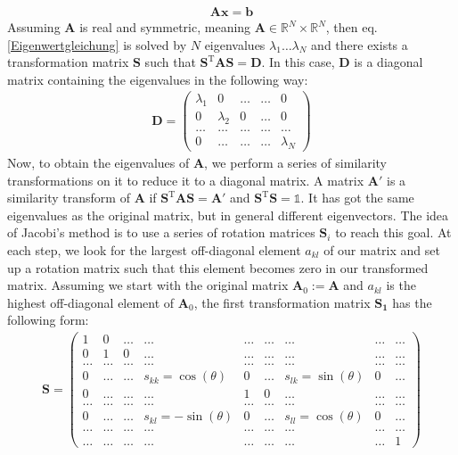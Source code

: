 \documentclass[10pt,a4paper]{article}
\begin{document}
\begin{align}\label{Eigenwertgleichung}
	\mathbf{A} \mathbf{x} = \mathbf{b}
\end{align}
Assuming $\mathbf{A}$ is real and symmetric, meaning $\mathbf{A}\in\mathbb{R}^N\times\mathbb{R}^N$, then eq. \eqref{Eigenwertgleichung} is solved by $N$ eigenvalues $\lambda_1\dots\lambda_N$ and there exists a transformation matrix $\mathbf{S}$ such that $\mathbf{S^{\mathrm{T}}}\mathbf{A}\mathbf{S}=\mathbf{D}$. In this case, $\mathbf{D}$ is a diagonal matrix containing the eigenvalues in the following way:
\begin{align}
\mathbf{D}=\left(\begin{array}{ccccc}
\lambda_1&0&\dots&\dots&0\\
0&\lambda_2&0&\dots&0\\
\dots&\dots&\dots&\dots&\dots\\
0&\dots&\dots&\dots&\lambda_N
\end{array}\right)
\end{align}
Now, to obtain the eigenvalues of $\mathbf{A}$, we perform a series of similarity transformations on it to reduce it to a diagonal matrix. A matrix $\mathbf{A}'$ is a similarity transform of $\mathbf{A}$ if $\mathbf{S^{\mathrm{T}}}\mathbf{A}\mathbf{S}=\mathbf{A}'$ and $\mathbf{S^{\mathrm{T}}}\mathbf{S}=\mathbb{1}$. It has got the same eigenvalues as the original matrix, but in general different eigenvectors. The idea of Jacobi's method is to use a series of rotation matrices $\mathbf{S}_i$ to reach this goal. At each step, we look for the largest off-diagonal element $a_{kl}$ of our matrix and set up a rotation matrix such that this element becomes zero in our transformed matrix. Assuming we start with the original matrix $\mathbf{A}_0:=\mathbf{A}$ and $a_{kl}$ is the highest off-diagonal element of $\mathbf{A}_0$, the first transformation matrix $\mathbf{S_1}$ has the following form:
\begin{align}
\mathbf{S}=\left(\begin{array}{ccccccccc}
1&0&\dots&\dots&\dots&\dots&\dots&\dots&\dots\\
0&1&0&\dots&\dots&\dots&\dots&\dots&\dots\\
\dots&\dots&\dots&\dots&\dots&\dots&\dots&\dots&\dots\\
0&\dots&\dots&s_{kk}=\cos(\theta)&0&\dots&s_{lk}=\sin(\theta)&0&\dots\\
0&\dots&\dots&\dots&1&0&\dots&\dots&\dots\\
\dots&\dots&\dots&\dots&\dots&\dots&\dots&\dots&\dots\\
0&\dots&\dots&s_{kl}=-\sin(\theta)&0&\dots&s_{ll}=\cos(\theta)&0&\dots\\
\dots&\dots&\dots&\dots&\dots&\dots&\dots&\dots&\dots\\
\dots&\dots&\dots&\dots&\dots&\dots&\dots&\dots&1
\end{array}\right)
\end{align}
\end{document}
